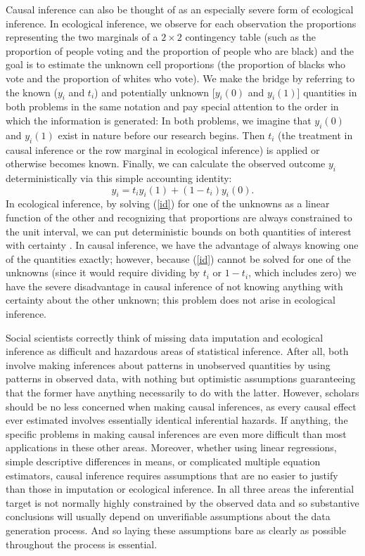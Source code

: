 \documentclass[11pt,titlepage]{article}
\begin{document}
Causal inference can also be thought of as an especially severe form
of ecological inference.  In ecological inference, we observe for each
observation the proportions representing the two marginals of a
$2\times 2$ contingency table (such as the proportion of people voting
and the proportion of people who are black) and the goal is to
estimate the unknown cell proportions (the proportion of blacks who
vote and the proportion of whites who vote).  We make the bridge by
referring to the known ($y_i$ and $t_i$) and potentially unknown
[$y_i(0)$ and $y_i(1)$] quantities in both problems in the same
notation and pay special attention to the order in which the
information is generated: In both problems, we imagine that $y_i(0)$
and $y_i(1)$ exist in nature before our research begins.  Then $t_i$
(the treatment in causal inference or the row marginal in ecological
inference) is applied or otherwise becomes known.  Finally, we can
calculate the observed outcome $y_i$ deterministically via this simple
accounting identity:
\begin{equation}
  \label{id}
  y_i = t_iy_i(1) + (1-t_i)y_i(0).
\end{equation}
In ecological inference, by solving (\ref{id}) for one of the unknowns
as a linear function of the other and recognizing that proportions are
always constrained to the unit interval, we can put deterministic
bounds on both quantities of interest with certainty
\citep[][ch.5]{King97}.  In causal inference, we have the advantage of
always knowing one of the quantities exactly; however, because
(\ref{id}) cannot be solved for one of the unknowns (since it would
require dividing by $t_i$ or $1-t_i$, which includes zero) we have the
severe disadvantage in causal inference of not knowing anything with
certainty about the other unknown; this problem does not arise in
ecological inference.

Social scientists correctly think of missing data imputation and
ecological inference as difficult and hazardous areas of statistical
inference.  After all, both involve making inferences about patterns
in unobserved quantities by using patterns in observed data, with
nothing but optimistic assumptions guaranteeing that the former have
anything necessarily to do with the latter.  However, scholars should
be no less concerned when making causal inferences, as every causal
effect ever estimated involves essentially identical inferential
hazards.  If anything, the specific problems in making causal
inferences are even more difficult than most applications in these
other areas.  Moreover, whether using linear regressions, simple
descriptive differences in means, or complicated multiple equation
estimators, causal inference requires assumptions that are no easier
to justify than those in imputation or ecological inference.  In all
three areas the inferential target is not normally highly constrained
by the observed data and so substantive conclusions will usually
depend on unverifiable assumptions about the data generation process.
And so laying these assumptions bare as clearly as possible throughout
the process is essential.
\end{document}
